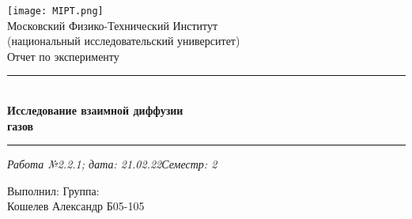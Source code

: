 \documentclass[12pt,a4paper]{scrartcl}
\begin{document}
	\graphicspath{{C:/Users/Alex/OneDrive/Изображения/TexImgs}}
	
	\newcommand{\ms}{\mathstrut}
	\newcommand{\msp}{\hspace{0.5cm}}
	\newcommand{\al}{\alpha}
	\newcommand{\dg}{^\circ}
	\newcommand{\qd}[2]{^{\frac{#1}{#2}}}
	\newcommand{\qdm}[2]{^{-\frac{#1}{#2}}}
	\newcommand{\lm}[2]{\underset{#1 \rightarrow #2}{\lim}}
	\newcommand{\sfrac}[2]{\dfrac{\strut #1}{\strut #2}}
	\newcommand{\equal}[1]{\overset{(#1)}{=}}
	\newcommand{\linevdots}{\ \raisebox{-.08\height}{\vdots}\ }
	\newcommand{\linecvdots}{\ \raisebox{-.08\height}{\vdots}\hspace{-0.13cm}\raisebox{.15\height}{\cancel{\phantom{a}}\hspace{0.06cm}}}
	\newcommand{\combox}[1]{\ms \msp \msp \begin{minipage}{0.95\linewidth}
			#1
	\end{minipage}}
	
	\newtheorem{pr}{Задача}
	\newtheorem{ex}{Пример}
	\newtheorem{dfn}{Def}
	\newtheorem{theorem}{Th}
	
	\newenvironment{slv}{\ms \msp \textit{Решение:}}{}
	\newenvironment{proof}{\ms \msp \textit{Доказательство: }}{\hfill $\square$}
	
	\begin{titlepage}
		
		\vspace*{\fill}
		
		\begin{center}
			\texttt{[image: MIPT.png]}
			\\[0.7cm]\Huge Московский Физико-Технический Институт\\(национальный исследовательский университет)
			\\[2cm]\LARGE Отчет по эксперименту
			\\[0.5cm]\noindent\rule{\textwidth}{1pt}
			\\\Huge\textbf{Исследование взаимной диффузии\\газов}
			\\[-0.5cm]\noindent\rule{\textwidth}{1pt}
		\end{center}
		
		\begin{flushleft}
			\textit{Работа №2.2.1; дата: 21.02.22}\hfill\textit{Семестр: 2}
		\end{flushleft}
		
		\vspace*{\fill}
		
		\begin{flushleft}
			Выполнил: \hspace{\fill} Группа:
			\\Кошелев Александр \hspace{\fill} Б05-105
		\end{flushleft}
	\end{titlepage}
	
\end{document}
